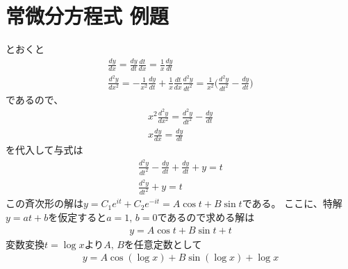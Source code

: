 \section{常微分方程式 例題}
\begin{practice*}
\end{practice*}
\begin{ans*}
  とおくと
  \begin{gather}
    \frac{dy}{dx} = \frac{dy}{dt}\frac{dt}{dx} = \frac{1}{x}\frac{dy}{dt} \\
    \frac{d^2y}{dx^2}
    = -\frac{1}{x^2}\frac{dy}{dt} + \frac{1}{x}\frac{dt}{dx}\frac{d^2y}{dt^2}
    = \frac{1}{x^2}\biggl(\frac{d^2y}{dt^2} - \frac{dy}{dt}\biggr)
  \end{gather}
  であるので、
  \begin{gather}
    x^2\frac{d^2y}{dx^2} = \frac{d^2y}{dt^2} - \frac{dy}{dt} \\
    x\frac{dy}{dx} = \frac{dy}{dt}
  \end{gather}
  を代入して与式は
  \begin{gather}
    \frac{d^2y}{dt^2} - \frac{dy}{dt} + \frac{dy}{dt} + y = t \\
    \frac{d^2y}{dt^2} + y = t
  \end{gather}
  この斉次形の解は$y = C_{1}e^{it} + C_{2}e^{-it} = A\cos t + B\sin t$である。
  ここに、特解$y=at+b$を仮定すると$a=1,\,b=0$であるので求める解は
  \begin{gather}
    y = A\cos t + B\sin t + t
  \end{gather}
  変数変換$t = \log x$より$A,\,B$を任意定数として
  \begin{gather}
    y = A\cos(\log x) + B\sin(\log x) + \log x
  \end{gather}
\end{ans*}

\begin{practice*}
  \begin{ans*}

  \end{ans*}
\end{practice*}

\begin{practice*}
\end{practice*}
